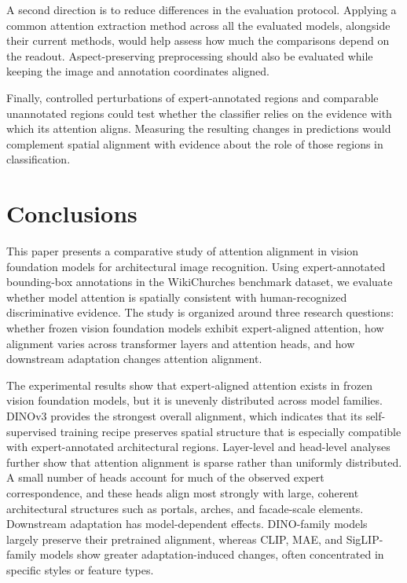 \documentclass[lineno,pdflatex,sn-mathphys-num]{sn-jnl}%
\theoremstyle{thmstyleone}%
\theoremstyle{thmstyletwo}%
\theoremstyle{thmstylethree}%
\begin{document}
A second direction is to reduce differences in the evaluation protocol. Applying a common attention extraction method across all the evaluated models, alongside their current methods, would help assess how much the comparisons depend on the readout. Aspect-preserving preprocessing should also be evaluated while keeping the image and annotation coordinates aligned.

Finally, controlled perturbations of expert-annotated regions and comparable unannotated regions could test whether the classifier relies on the evidence with which its attention aligns. Measuring the resulting changes in predictions would complement spatial alignment with evidence about the role of those regions in classification.

\section{Conclusions} \label{section conclusions}

This paper presents a comparative study of attention alignment in vision foundation models for architectural image recognition. Using expert-annotated bounding-box annotations in the WikiChurches benchmark dataset, we evaluate whether model attention is spatially consistent with human-recognized discriminative evidence. The study is organized around three research questions: whether frozen vision foundation models exhibit expert-aligned attention, how alignment varies across transformer layers and attention heads, and how downstream adaptation changes attention alignment.

The experimental results show that expert-aligned attention exists in frozen vision foundation models, but it is unevenly distributed across model families. DINOv3 provides the strongest overall alignment, which indicates that its self-supervised training recipe preserves spatial structure that is especially compatible with expert-annotated architectural regions. Layer-level and head-level analyses further show that attention alignment is sparse rather than uniformly distributed. A small number of heads account for much of the observed expert correspondence, and these heads align most strongly with large, coherent architectural structures such as portals, arches, and facade-scale elements. Downstream adaptation has model-dependent effects. DINO-family models largely preserve their pretrained alignment, whereas CLIP, MAE, and SigLIP-family models show greater adaptation-induced changes, often concentrated in specific styles or feature types.
\end{document}
